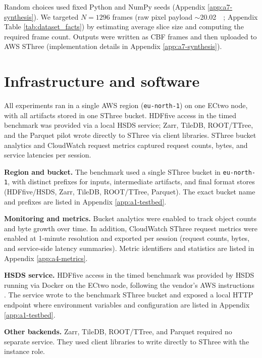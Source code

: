 \documentclass[nomenclature, english, bibtex]{kththesis}
\numberwithin{listing}{chapter}
\begin{document}
Random choices used fixed Python and NumPy seeds (Appendix \ref{app:a7-synthesis}). We targeted $N{=}1296$ frames (raw pixel payload \(\sim\)\SI{20.02}{\gibi\byte}; Appendix Table \ref{tab:dataset_facts}) by estimating average slice size and computing the required frame count. Outputs were written as \gls{CBF} frames and then uploaded to \gls{AWS} \gls{SThree} (implementation details in Appendix \ref{app:a7-synthesis}).

\section{Infrastructure and software}
All experiments ran in a single \gls{AWS} region (\texttt{eu-north-1}) on one \gls{ECtwo} node, with all artifacts stored in one \gls{SThree} bucket. \gls{HDFfive} access in the timed benchmark was provided via a local \gls{HSDS} service; Zarr, TileDB, \gls{ROOT}/\gls{TTree}, and the Parquet pilot wrote directly to \gls{SThree} via client libraries. \gls{SThree} bucket analytics and CloudWatch request metrics captured request counts, bytes, and service latencies per session.

\textbf{Region and bucket.} The benchmark used a single \gls{SThree} bucket in \texttt{eu-north-1}, with distinct prefixes for inputs, intermediate artifacts, and final format stores (\gls{HDFfive}/\gls{HSDS}, Zarr, TileDB, \gls{ROOT}/\gls{TTree}, Parquet). The exact bucket name and prefixes are listed in Appendix \ref{app:a1-testbed}.

\textbf{Monitoring and metrics.} Bucket analytics were enabled to track object counts and byte growth over time. In addition, CloudWatch \gls{SThree} request metrics were enabled at 1-minute resolution and exported per session (request counts, bytes, and service-side latency summaries). Metric identifiers and statistics are listed in Appendix \ref{app:a4-metrics}.

\textbf{\gls{HSDS} service.} \gls{HDFfive} access in the timed benchmark was provided by \gls{HSDS} running via Docker on the \gls{ECtwo} node, following the vendor’s \gls{AWS} instructions \cite{hdfgroup-hsds-aws-docker}. The service wrote to the benchmark \gls{SThree} bucket and exposed a local \gls{HTTP} endpoint where environment variables and configuration are listed in Appendix \ref{app:a1-testbed}.

\textbf{Other backends.} Zarr, TileDB, \gls{ROOT}/\gls{TTree}, and Parquet required no separate service. They used client libraries to write directly to \gls{SThree} with the instance role.
\end{document}
